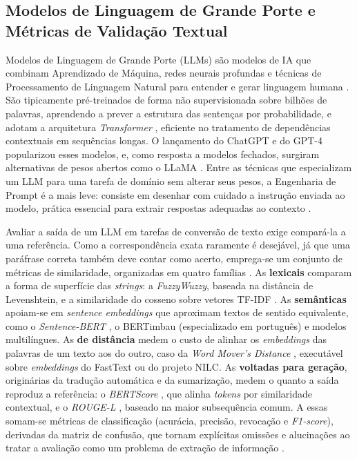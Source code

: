 \documentclass[a4paper,fleqn]{cas-sc}
\begin{document}
\subsection{Modelos de Linguagem de Grande Porte e Métricas de Validação Textual}\label{sec:llm-metricas}
Modelos de Linguagem de Grande Porte (LLMs) são modelos de IA que combinam Aprendizado de Máquina, redes neurais profundas e técnicas de Processamento de Linguagem Natural para entender e gerar linguagem humana \citep{touvron2023}. São tipicamente pré-treinados de forma não supervisionada sobre bilhões de palavras, aprendendo a prever a estrutura das sentenças por probabilidade, e adotam a arquitetura \textit{Transformer} \citep{vaswani2017}, eficiente no tratamento de dependências contextuais em sequências longas. O lançamento do ChatGPT e do GPT-4 \citep{openai2024} popularizou esses modelos, e, como resposta a modelos fechados, surgiram alternativas de pesos abertos como o LLaMA \citep{touvron2023,llama3}. Entre as técnicas que especializam um LLM para uma tarefa de domínio sem alterar seus pesos, a Engenharia de Prompt é a mais leve: consiste em desenhar com cuidado a instrução enviada ao modelo, prática essencial para extrair respostas adequadas ao contexto \citep{brown2020}.

Avaliar a saída de um LLM em tarefas de conversão de texto exige compará-la a uma referência. Como a correspondência exata raramente é desejável, já que uma paráfrase correta também deve contar como acerto, emprega-se um conjunto de métricas de similaridade, organizadas em quatro famílias \citep{jurafsky2009}. As \textbf{lexicais} comparam a forma de superfície das \textit{strings}: a \textit{FuzzyWuzzy}, baseada na distância de Levenshtein, e a similaridade do cosseno sobre vetores TF-IDF \citep{manning2008}. As \textbf{semânticas} apoiam-se em \textit{sentence embeddings} que aproximam textos de sentido equivalente, como o \textit{Sentence-BERT} \citep{reimers2019}, o BERTimbau (especializado em português) \citep{souza2020} e modelos multilíngues. As \textbf{de distância} medem o custo de alinhar os \textit{embeddings} das palavras de um texto aos do outro, caso da \textit{Word Mover's Distance} \citep{kusner2015}, executável sobre \textit{embeddings} do FastText \citep{bojanowski2017} ou do projeto NILC. As \textbf{voltadas para geração}, originárias da tradução automática e da sumarização, medem o quanto a saída reproduz a referência: o \textit{BERTScore} \citep{zhang2020bertscore}, que alinha \textit{tokens} por similaridade contextual, e o \textit{ROUGE-L} \citep{lin2004rouge}, baseado na maior subsequência comum. A essas somam-se métricas de classificação (acurácia, precisão, revocação e \textit{F1-score}), derivadas da matriz de confusão, que tornam explícitas omissões e alucinações ao tratar a avaliação como um problema de extração de informação \citep{manning2008}.
\end{document}
